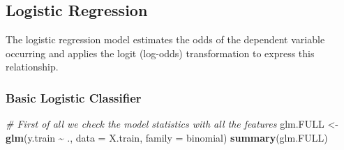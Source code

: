 \documentclass[
  10pt,
  paper=a4,
  ,captions=tableheading
]{scrartcl}
\newenvironment{Shaded}{\begin{snugshade}}{\end{snugshade}}
\newcommand{\AttributeTok}[1]{\textcolor[rgb]{0.13,0.29,0.53}{#1}}
\newcommand{\CommentTok}[1]{\textcolor[rgb]{0.56,0.35,0.01}{\textit{#1}}}
\newcommand{\FunctionTok}[1]{\textcolor[rgb]{0.13,0.29,0.53}{\textbf{#1}}}
\newcommand{\NormalTok}[1]{#1}
\newcommand{\OtherTok}[1]{\textcolor[rgb]{0.56,0.35,0.01}{#1}}
\newcommand{\SpecialCharTok}[1]{\textcolor[rgb]{0.81,0.36,0.00}{\textbf{#1}}}
\begin{document}
\subsection{Logistic Regression}\label{logistic-regression}

The logistic regression model estimates the odds of the dependent
variable occurring and applies the logit (log-odds) transformation to
express this relationship.

\subsubsection{Basic Logistic
Classifier}\label{basic-logistic-classifier}

\small

\begin{Shaded}
\begin{Highlighting}[]
\CommentTok{\# First of all we check the model statistics with all the features}
\NormalTok{glm.FULL }\OtherTok{\textless{}{-}} \FunctionTok{glm}\NormalTok{(y.train }\SpecialCharTok{\textasciitilde{}}\NormalTok{ ., }\AttributeTok{data =}\NormalTok{ X.train, }\AttributeTok{family =}\NormalTok{ binomial)}
\FunctionTok{summary}\NormalTok{(glm.FULL)}
\end{Highlighting}
\end{Shaded}
\end{document}
